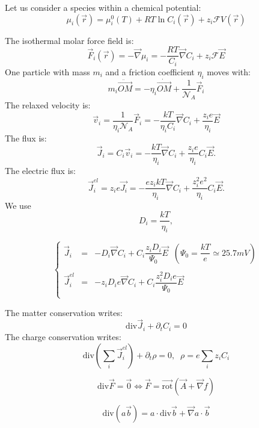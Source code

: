 \documentclass[aps,12pt]{revtex4}
\begin{document}
Let us consider a species within a chemical potential:
\begin{equation}
	\mu_i(\vec{r}) = \mu_i^0(T) + RT \ln C_i(\vec{r}) +  z_i \mathcal{F} V(\vec{r})
\end{equation}

The isothermal molar force field is:
\begin{equation}
	\vec{F}_i(\vec{r}) = -\vec{\nabla} \mu_{i} = -\frac{RT}{C_i} \vec{\nabla} C_i + z_i \mathcal{F} \vec{E}
\end{equation}
One particle with mass $m_i$ and a friction coefficient $\eta_i$ moves with:
\begin{equation}
	m_i  \ddot{\vec{OM}} = -\eta_i  \dot{\vec{OM}} + \dfrac{1}{\mathcal{N}_A} \vec{F}_i
\end{equation}
The relaxed velocity is:
\begin{equation}
	\vec{v}_i = \dfrac{1}{\eta_i\mathcal{N}_A} \vec{F}_i = -\dfrac{kT}{\eta_i C_i} \vec{\nabla} C_i + \frac{z_i e}{\eta_i} \vec{E}
\end{equation}
The flux is:
\begin{equation}
	\vec{J}_i = C_i \vec{v}_i = -\dfrac{kT}{\eta_i} \vec{\nabla} C_i + \dfrac{z_i e}{\eta_i} C_i \vec{E}.
\end{equation}
The electric flux is:
\begin{equation}
	\vec{J}^{el}_i = z_i e \vec{J_i} = -\dfrac{ez_ikT}{\eta_i} \vec{\nabla} C_i + \dfrac{z_i^2 e^2}{\eta_i} C_i \vec{E}.
\end{equation}
We use
\begin{equation}
	D_i = \dfrac{kT}{\eta_i}, 
\end{equation}

\begin{equation}
\left\lbrace
\begin{array}{rcl}
\vec{J}_i & = &  -D_i \vec{\nabla} C_i + C_i \dfrac{z_i D_i}{\Psi_0}  \vec{E} \;\; (\Psi_0=\dfrac{kT}{e}\simeq 25.7 mV)\\
\\
\vec{J}^{el}_i & = & - z_i D_i e  \vec{\nabla} C_i + C_i \dfrac{z_i^2 D_i e}{\Psi_0}  \vec{E} \\
\end{array}
\right.
\end{equation}


The matter conservation writes:
\begin{equation}
	\mathrm{div} \vec{J}_i + \partial_t C_i = 0
\end{equation}
The charge conservation writes:
\begin{equation}
	\mathrm{div} \left( \sum_i \vec{J}^{el}_i \right) + \partial_t \rho = 0, \;\; \rho = e \sum_i z_i C_i
\end{equation}

\begin{equation}
	\mathrm{div} \vec{F} = \vec{0} \Leftrightarrow \vec{F} = \vec{\mathrm{rot}} (\vec{A} + \vec{\nabla} f)
\end{equation}

\begin{equation}
	\mathrm{div} (a\vec{b}) = a \cdot \mathrm{div} \vec{b} + \vec{\nabla}a \cdot \vec{b}
\end{equation}
\end{document}

